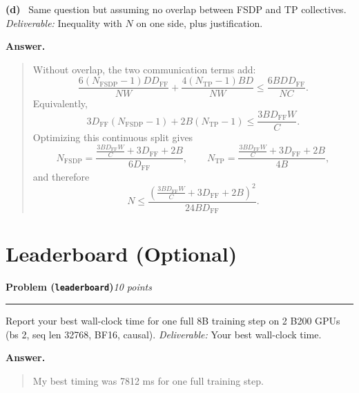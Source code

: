 \documentclass[11pt]{article}
\newcommand{\problem}[2]{%
  \vspace{0.6em}%
  \noindent\textbf{Problem (\texttt{#1})}\hfill\textit{#2 points}\par%
  \vspace{0.2em}\hrule\vspace{0.4em}%
}
\newcommand{\subq}[1]{\vspace{0.3em}\noindent\textbf{(#1)}\ }
\newcommand{\deliverable}[1]{\vspace{0.2em}\noindent\textit{Deliverable:} #1\par}
\newenvironment{answer}{%
  \vspace{0.3em}%
  \noindent\textbf{Answer.}\begin{quote}%
}{%
  \end{quote}\vspace{0.4em}%
}
\begin{document}
\subq{d} Same question but assuming no overlap between FSDP and TP collectives.
\deliverable{Inequality with $N$ on one side, plus justification.}
\begin{answer}
  Without overlap, the two communication terms add:
  \[
    \frac{6 (N_{\mathrm{FSDP}}-1) D D_{\mathrm{FF}}}{N W}
    +
    \frac{4 (N_{\mathrm{TP}}-1) B D}{N W}
    \le
    \frac{6 B D D_{\mathrm{FF}}}{N C}.
  \]
  Equivalently,
  \[
    3D_{\mathrm{FF}}(N_{\mathrm{FSDP}}-1)
    +
    2B(N_{\mathrm{TP}}-1)
    \le
    \frac{3 B D_{\mathrm{FF}} W}{C}.
  \]
  Optimizing this continuous split gives
  \[
    N_{\mathrm{FSDP}} =
    \frac{\frac{3 B D_{\mathrm{FF}} W}{C}+3D_{\mathrm{FF}}+2B}{6D_{\mathrm{FF}}},
    \qquad
    N_{\mathrm{TP}} =
    \frac{\frac{3 B D_{\mathrm{FF}} W}{C}+3D_{\mathrm{FF}}+2B}{4B},
  \]
  and therefore
  \[
    N \le
    \frac{\left(\frac{3 B D_{\mathrm{FF}} W}{C}+3D_{\mathrm{FF}}+2B\right)^2}
    {24 B D_{\mathrm{FF}}}.
  \]
\end{answer}


\section{Leaderboard (Optional)}

\problem{leaderboard}{10}
Report your best wall-clock time for one full 8B training step on 2 B200 GPUs (bs 2, seq len 32768, BF16, causal).
\deliverable{Your best wall-clock time.}
\begin{answer}
  My best timing was 7812 ms for one full training step.
\end{answer}
\end{document}
